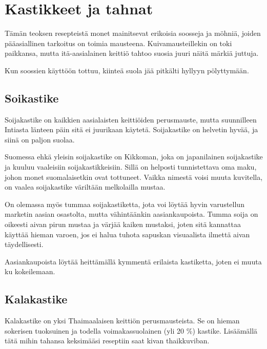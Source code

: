\documentclass[../keittiokirja.tex]{subfiles}
\begin{document}
\chapter{Kastikkeet ja tahnat}
\label{chp:kastikkeet}

Tämän teoksen resepteistä monet mainitsevat erikoisia soosseja ja möhniä, 
joiden pääasiallinen tarkoitus on toimia mausteena. Kuivamausteillekin on 
toki paikkansa, mutta itä-aasialainen keittiö tahtoo suosia juuri näitä märkiä 
juttuja. 

Kun soossien käyttöön tottuu, kiinteä suola jää pitkälti hyllyyn pölyttymään.


\section{Soikastike}
\label{sec:soijakastike}

Soijakastike on kaikkien aasialaisten keittiöiden perusmauste, mutta suunnilleen Intiasta länteen 
päin sitä ei juurikaan käytetä. Soijakastike on helvetin hyvää, ja siinä on paljon suolaa.

Suomessa ehkä yleisin soijakastike on Kikkoman, joka on japanilainen soijakastike ja kuuluu 
vaaleisiin soijakastikkeisiin. Sillä on helposti tunnistettava oma maku, johon monet 
suomalaisetkin ovat tottuneet. Vaikka nimestä voisi muuta kuvitella, on vaalea soijakastike väriltään 
melkolailla mustaa.

On olemassa myös tummaa soijakastiketta, jota voi löytää hyvin varustellun marketin aasian osastolta, 
mutta vähintäänkin aasiankaupoista. Tumma soija on oikeesti aivan pirun mustaa ja värjää kaiken mustaksi, 
joten sitä kannattaa käyttää hieman varoen, jos ei halua tuhota sapuskan visuaalista ilmettä aivan 
täydellisesti.

Aasiankaupoista löytää heittämällä kymmentä erilaista kastiketta, joten ei muuta ku kokeilemaan. 


\section{Kalakastike}
\label{sec:kalakastike}

Kalakastike on yksi Thaimaalaisen keittiön perusmausteista. Se on hieman sokerisen tuoksuinen ja 
todella voimakassuolainen (yli 20 \%) kastike. Lisäämällä tätä mihin tahansa keksimääsi reseptiin 
saat kivan thaikkuviban.
\end{document}
